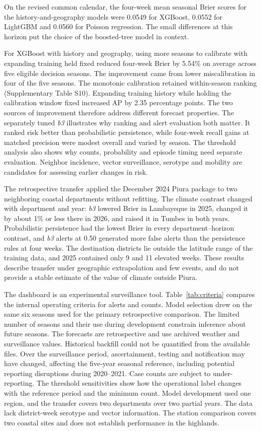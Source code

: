 \documentclass[journal]{IEEEtran}
\newcommand{\bthree}{\textit{b3}}
\begin{document}
On the revised common calendar, the four-week mean seasonal Brier scores for the history-and-geography models were 0.0549 for XGBoost, 0.0552 for LightGBM and 0.0560 for Poisson regression. The small differences at this horizon put the choice of the boosted-tree model in context.

For XGBoost with history and geography, using more seasons to calibrate with expanding training held fixed reduced four-week Brier by 5.54\% on average across five eligible decision seasons. The improvement came from lower miscalibration in four of the five seasons. The monotonic calibration retained within-season ranking (Supplementary Table S10). Expanding training history while holding the calibration window fixed increased AP by 2.35 percentage points. The two sources of improvement therefore address different forecast properties. The separately tuned \bthree{} illustrates why ranking and alert evaluation both matter. It ranked risk better than probabilistic persistence, while four-week recall gains at matched precision were modest overall and varied by season. The threshold analysis also shows why counts, probability and episode timing need separate evaluation. Neighbor incidence, vector surveillance, serotype and mobility are candidates for assessing earlier changes in risk.

The retrospective transfer applied the December 2024 Piura package to two neighboring coastal departments without refitting. The climate contrast changed with department and year: \bthree{} lowered Brier in Lambayeque in 2025, changed it by about 1\% or less there in 2026, and raised it in Tumbes in both years. Probabilistic persistence had the lowest Brier in every department--horizon contrast, and \bthree{} alerts at 0.50 generated more false alerts than the persistence rules at four weeks. The destination districts lie outside the latitude range of the training data, and 2025 contained only 9 and 11 elevated weeks. These results describe transfer under geographic extrapolation and few events, and do not provide a stable estimate of the value of climate outside Piura.

The dashboard is an experimental surveillance tool. Table~\ref{tab:criteria} compares the internal operating criteria for alerts and counts. Model selection drew on the same six seasons used for the primary retrospective comparison. The limited number of seasons and their use during development constrain inference about future seasons. The forecasts are retrospective and use archived weather and surveillance values. Historical backfill could not be quantified from the available files. Over the surveillance period, ascertainment, testing and notification may have changed, affecting the five-year seasonal reference, including potential reporting disruptions during 2020--2021. Case counts are subject to under-reporting. The threshold sensitivities show how the operational label changes with the reference period and the minimum count. Model development used one region, and the transfer covers two departments over two partial years. The data lack district-week serotype and vector information. The station comparison covers two coastal sites and does not establish performance in the highlands.
\end{document}
